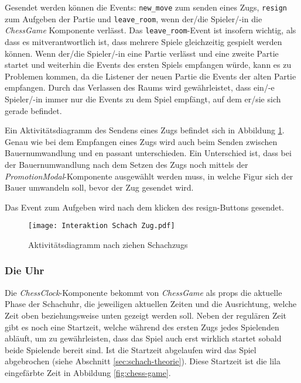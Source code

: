 Gesendet werden können die Events: \verb|new_move| zum senden eines Zugs, \verb|resign| zum Aufgeben der Partie und \verb|leave_room|, wenn der/die Spieler/-in die \textit{ChessGame} Komponente verlässt.
Das \verb|leave_room|-Event ist insofern wichtig, als dass es mitverantwortlich ist, dass mehrere Spiele gleichzeitig gespielt werden können. Wenn der/die Spieler/-in eine Partie verlässt und eine zweite Partie startet und weiterhin die Events des ersten Spiels empfangen würde, kann es zu Problemen kommen, da die Listener der neuen Partie die Events der alten Partie empfangen. Durch das Verlassen des Raums wird gewährleistet, dass ein/-e Spieler/-in immer nur die Events zu dem Spiel empfängt, auf dem er/sie sich gerade befindet.

Ein Aktivitätsdiagramm des Sendens eines Zugs befindet sich in Abbildung \ref{fig:chess-move}. Genau wie bei dem Empfangen eines Zugs wird auch beim Senden zwischen Bauernumwandlung und en passant unterschieden. Ein Unterschied ist, dass bei der Bauernumwandlung nach dem Setzen des Zugs noch mittels der  \textit{PromotionModal}-Komponente ausgewählt werden muss, in welche Figur sich der Bauer umwandeln soll, bevor der Zug gesendet wird.

Das Event zum Aufgeben wird nach dem klicken des \glqq resign\grqq -Buttons gesendet.

      \begin{figure}[!htb]
      \centering
  \texttt{[image: Interaktion Schach Zug.pdf]}
  \caption{Aktivitätsdiagramm nach ziehen Schachzugs}
  \label{fig:chess-move}
\end{figure}


        \subsubsection{Die Uhr}
        \label{sec:Frontend-Uhr}
Die \textit{ChessClock}-Komponente bekommt von \textit{ChessGame} als props die aktuelle Phase der Schachuhr, die jeweiligen aktuellen Zeiten und die Ausrichtung, welche Zeit oben beziehungsweise unten gezeigt werden soll. Neben der regulären Zeit gibt es noch eine Startzeit, welche während des ersten Zugs jedes Spielenden abläuft, um zu gewährleisten, dass das Spiel auch erst wirklich startet sobald beide Spielende bereit sind. Ist die Startzeit abgelaufen wird das Spiel abgebrochen (siehe Abschnitt \ref{sec:schach-theorie}). Diese Startzeit ist die lila eingefärbte Zeit in Abbildung \ref{fig:chess-game}.


